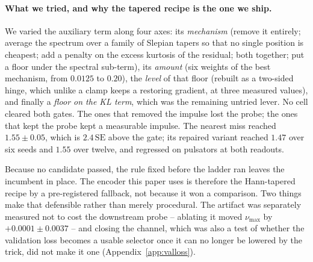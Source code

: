 \documentclass{article}
\begin{document}
\paragraph{What we tried, and why the tapered recipe is the one we ship.} We varied the auxiliary
term along four axes: its \emph{mechanism} (remove it entirely; average the spectrum over a family of
Slepian tapers so that no single position is cheapest; add a penalty on the excess kurtosis of the
residual; both together; put a floor under the spectral sub-term), its \emph{amount} (six weights of
the best mechanism, from $0.0125$ to $0.20$), the \emph{level} of that floor (rebuilt as a two-sided
hinge, which unlike a clamp keeps a restoring gradient, at three measured values), and finally a
\emph{floor on the KL term}, which was the remaining untried lever. No cell cleared both gates. The
ones that removed the impulse lost the probe; the ones that kept the probe kept a measurable impulse.
The nearest miss reached $1.55 \pm 0.05$, which is $2.4\,\mathrm{SE}$ above the gate; its repaired
variant reached $1.47$ over six seeds and $1.55$ over twelve, and regressed on pulsators at both
readouts.

Because no candidate passed, the rule fixed before the ladder ran leaves the incumbent in place. The
encoder this paper uses is therefore the Hann-tapered recipe by a pre-registered fallback, not
because it won a comparison. Two things make that defensible rather than merely procedural. The
artifact was separately measured not to cost the downstream probe -- ablating it moved $\nu_{\max}$
by $+0.0001 \pm 0.0037$ -- and closing the channel, which was also a test of whether the validation
loss becomes a usable selector once it can no longer be lowered by the trick, did not make it one
(Appendix~\ref{app:valloss}).
\end{document}

